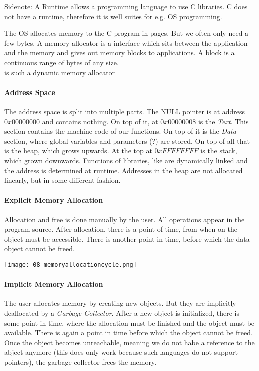 


Sidenote: A Runtime allows a programming language to use C libraries. C does not have a runtime, therefore it is well suites for e.g. OS programming.

The OS allocates memory to the C program in pages. But we often only need a few bytes. A memory allocator is a interface which sits between the application and the memory and gives out memory blocks to applications. A block is a continuous range of bytes of any size.\\
 is such a dynamic memory allocator

\paragraph{Address Space}
The address space is split into multiple parts. The NULL pointer is at address $0x00000000$ and contains nothing. On top of it, at $0x00000008$ is the \textit{Text}. This section contains the machine code of our functions. On top of it is the \textit{Data} section, where global variables and parameters (?) are stored. On top of all that is the heap, which grows upwards. At the top at $0xFFFFFFFF$ is the stack, which grown downwards. Functions of libraries, like  are dynamically linked and the address is determined at runtime. Addresses in the heap are not allocated linearly, but in some different fashion.

\paragraph{Explicit Memory Allocation}
Allocation and free is done manually by the user. All operations appear in the program source. After allocation, there is a point of time, from when on the object must be accessible. There is another point in time, before which the data object cannot be freed.

\texttt{[image: 08\_memoryallocationcycle.png]}

\paragraph{Implicit Memory Allocation}
The user allocates memory by creating new objects. But they are implicitly deallocated by a \textit{Garbage Collector}. After a new object is initialized, there is some point in time, where the allocation must be finished and the object must be available. There is again a point in time before which the object cannot be freed. Once the object becomes unreachable, meaning we do not habe a reference to the abject anymore (this does only work because such languages do not support pointers), the garbage collector frees the memory.

